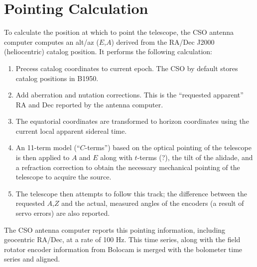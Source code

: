 \documentclass{emulateapj}
\begin{document}
\section{Pointing Calculation}
\label{app:PointingCalculation}

To calculate the position at which to point the telescope, the CSO
antenna computer computes an alt/az ($E$,$A$) derived from the RA/Dec J2000
(heliocentric) catalog position.  It performs the following
calculation:

\begin{enumerate}

\item Precess catalog coordinates to current epoch.  The CSO by
default stores catalog positions in B1950.

\item Add aberration and nutation corrections.  This is the
``requested apparent'' RA and Dec reported by the antenna computer.

\item The equatorial coordinates are transformed to horizon
coordinates using the current local apparent sidereal time.

\item An 11-term model (``$C$-terms'') based on the optical pointing of
the telescope is then applied to $A$ and $E$ along with $t$-terms (?), %
the tilt of the alidade, and a refraction correction to obtain the
necessary mechanical pointing of the telescope to acquire the source.

\item The telescope then attempts to follow this track; the difference
between the requested $A$,$Z$ and the actual, measured angles of the
encoders (a result of servo errors) are also reported.



\end{enumerate}

The CSO antenna computer reports this pointing information, including
geocentric RA/Dec, at a rate of 100 Hz.  This time series, along with
the field rotator encoder information from Bolocam is merged with the
bolometer time series and aligned.
\end{document}
